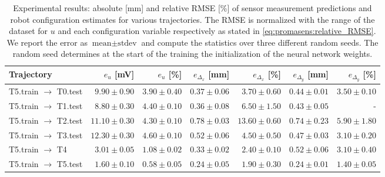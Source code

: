 \begingroup
\setlength{\tabcolsep}{6pt} %
\begin{table}\small
\centering
\caption{Experimental results: absolute [mm] and relative RMSE [\%] of sensor measurement predictions and robot configuration estimates for various trajectories. The RMSE is normalized with the range of the dataset for $u$ and each configuration variable respectively as stated in \eqref{eq:promasens:relative_RMSE}. We report the error as $\text{mean} \pm \text{stdev}$ and compute the statistics over three different random seeds. The random seed determines at the start of the training the initialization of the neural network weights.}
\begin{tabular}{l rr rrrr}\toprule
\textbf{Trajectory} & $e_{u}$ [mV] & $e_{u}$ [\%] & $e_{\Delta_x}$ [mm] & $e_{\Delta_x}$ [\%] & $e_{\Delta_y}$ [mm] & $e_{\Delta_y}$ [\%]\\
\midrule
T5.train $\rightarrow$ T0.test & $9.90 \pm 0.90$ & $3.90 \pm 0.40$ & $0.37 \pm 0.06$ & $3.70 \pm 0.60$ & $0.44 \pm 0.01$ & $3.50 \pm 0.10$\\ %
T5.train $\rightarrow$ T1.test & $8.80 \pm 0.30$ & $4.40 \pm 0.10$ & $0.36 \pm 0.08$ & $6.50 \pm 1.50$ & $0.43 \pm 0.05$ & -\\ %
T5.train $\rightarrow$ T2.test & $11.10 \pm 0.30$ & $4.30 \pm 0.10$ & $0.78 \pm 0.03$ & $13.60 \pm 0.60$ & $0.74 \pm 0.23$ & $5.90 \pm 1.80$\\ %
T5.train $\rightarrow$ T3.test & $12.30 \pm 0.30$ & $4.60 \pm 0.10$ & $0.52 \pm 0.06$ & $4.50 \pm 0.50$ & $0.47 \pm 0.03$ & $3.10 \pm 0.20$\\ %
T5.train $\rightarrow$ T4 & $3.01 \pm 0.05$ & $1.08 \pm 0.02$ & $0.33 \pm 0.02$ & $2.40 \pm 0.10$ & $0.52 \pm 0.06$ & $3.10 \pm 0.40$\\ %
T5.train $\rightarrow$ T5.test & $1.60 \pm 0.10$ & $0.58 \pm 0.05$ & $0.24 \pm 0.05$ & $1.90 \pm 0.30$ & $0.24 \pm 0.01$ & $1.40 \pm 0.05$\\ %
\bottomrule
\end{tabular}
\label{tab:results_experiments}
\end{table}
\endgroup


